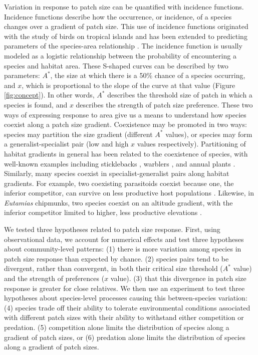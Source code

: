 Variation in response to patch size can be quantified with incidence
functions. Incidence functions describe how the occurrence, or
incidence, of a species changes over a gradient of patch size. This
use of incidence functions originated with the study of birds on
tropical islands \citep{Diamond1986} and has been extended to predicting
parameters of the species-area relationship \citep{Ovaskainen2003}. The
incidence function is usually modeled as a logistic relationship between
the probability of encountering a species and habitat area. These
S-shaped curves can be described by two parameters: \(A^{*}\), the size
at which there is a 50\% chance of a species occurring, and \(x\), which
is proportional to the slope of the curve at that value (Figure \ref{fig:concept}). In
other words, \(A^{*}\) describes the threshold size of patch in which a
species is found, and \(x\) describes the strength of patch size
preference. These two ways of expressing response to area give us a
means to understand how species coexist along a patch size gradient.
Coexistence may be promoted in two ways: species may partition the size
gradient (different \(A^{*}\) values), or species may form a
generalist-specialist pair (low and high \(x\) values respectively). Partitioning
of habitat gradients in general has been related to the coexistence of
species, with well-known examples including sticklebacks
\citep{Rundle2000}, warblers \citep{MacArthur1958}, and annual plants
\citep{Seabloom2003}. Similarly, many species coexist in
specialist-generalist pairs along habitat gradients. For example, two
coexisting parasitoids coexist because one, the inferior competitor, can
survive on less productive host populations \citep{Amarasekare2000}.
Likewise, in \emph{Eutamias} chipmunks, two species coexist on an
altitude gradient, with the inferior competitor limited to higher, less
productive elevations \citep{Sheppard1971}.

We tested three hypotheses related to patch size response. First, using
observational data, we account for numerical effects and test three
hypotheses about community-level patterns: (1) there is more variation among species
in patch size response than expected by chance. (2) species pairs tend to be divergent, rather than convergent, in
both their critical size threshold (\(A^{*}\) value) and the strength of
preferences (\(x\) value). (3) that this divergence in patch size
response is greater for close relatives. We then use an experiment to
test three hypotheses about species-level processes causing this between-species variation: (4) species trade off their ability to tolerate
environmental conditions associated with different patch sizes with
their ability to withstand either competition or predation. (5)
competition alone limits the distribution of species along a gradient of
patch sizes, or (6) predation alone limits the distribution of species
along a gradient of patch sizes.

